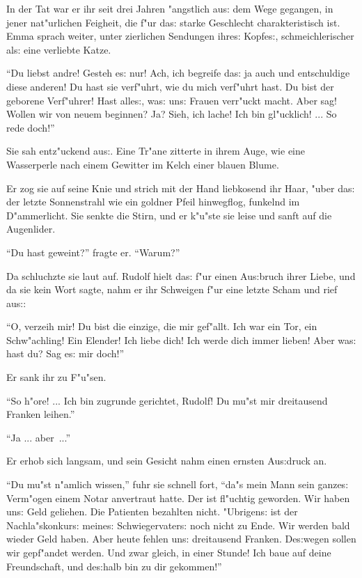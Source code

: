 \documentclass[oneside,12pt]{book}
\newcommand{\s}{s:}%
\begin{document}
In der Tat war er ihr seit drei Jahren "angstlich au{\s} dem Wege
gegangen, in jener nat"urlichen Feigheit, die f"ur da{\s} starke
Geschlecht charakteristisch ist. Emma sprach weiter, unter
zierlichen Sendungen ihre{\s} Kopfe{\s}, schmeichlerischer al{\s}
eine verliebte Katze.

"`Du liebst andre! Gesteh e{\s} nur! Ach, ich begreife da{\s} ja
auch und entschuldige diese anderen! Du hast sie verf"uhrt, wie du
mich verf"uhrt hast. Du bist der geborene Verf"uhrer! Hast
alle{\s}, wa{\s} un{\s} Frauen verr"uckt macht. Aber sag! Wollen
wir von neuem beginnen? Ja? Sieh, ich lache! Ich bin gl"ucklich!
... So rede doch!"'

Sie sah ent\/z"uckend au{\s}. Eine Tr"ane zitterte in ihrem Auge,
wie eine Wasserperle nach einem Gewitter im Kelch einer blauen
Blume.

Er zog sie auf seine Knie und strich mit der Hand liebkosend ihr
Haar, "uber da{\s} der letzte Sonnenstrahl wie ein goldner Pfeil
hinwegflog, funkelnd im D"ammerlicht. Sie senkte die Stirn, und er
k"u"ste sie leise und sanft auf die Augenlider.

"`Du hast geweint?"' fragte er. "`Warum?"'

Da schluchzte sie laut auf. Rudolf hielt da{\s} f"ur einen
Au{\s}bruch ihrer Liebe, und da sie kein Wort sagte, nahm er ihr
Schweigen f"ur eine letzte Scham und rief au{\s}:

"`O, verzeih mir! Du bist die einzige, die mir gef"allt. Ich war
ein Tor, ein Schw"achling! Ein Elender! Ich liebe dich! Ich werde
dich immer lieben! Aber wa{\s} hast du? Sag e{\s} mir doch!"'

Er sank ihr zu F"u"sen.

"`So h"ore! ... Ich bin zugrunde gerichtet, Rudolf! Du mu"st mir
dreitausend Franken leihen."'

"`Ja ... aber~..."'

Er erhob sich langsam, und sein Gesicht nahm einen ernsten
Au{\s}druck an.

"`Du mu"st n"amlich wissen,"' fuhr sie schnell fort, "`da"s mein
Mann sein ganze{\s} Verm"ogen einem Notar anvertraut hatte. Der
ist fl"uchtig geworden. Wir haben un{\s} Geld geliehen. Die
Patienten bezahlten nicht. "Ubrigen{\s} ist der Nachla"skonkur{\s}
meine{\s} Schwiegervater{\s} noch nicht zu Ende. Wir werden bald
wieder Geld haben. Aber heute fehlen un{\s} dreitausend Franken.
De{\s}wegen sollen wir gepf"andet werden. Und zwar gleich, in
einer Stunde! Ich baue auf deine Freundschaft, und de{\s}halb bin
zu dir gekommen!"'
\end{document}
